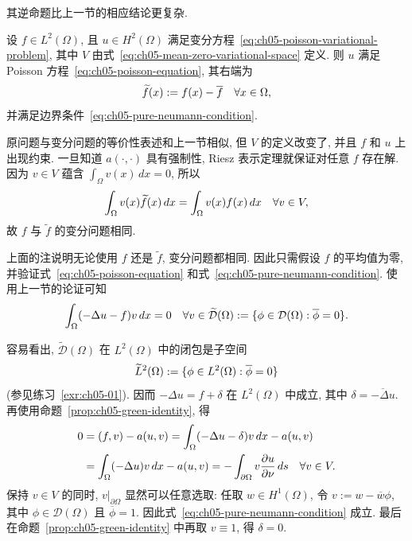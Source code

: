 其逆命题比上一节的相应结论更复杂.

\begin{Proposition}
\label{prop:ch05-pure-neumann-variational-implies-classical}
设 $f\in L^2(\Omega)$, 且 $u\in H^2(\Omega)$ 满足变分方程~\eqref{eq:ch05-poisson-variational-problem}, 其中 $V$ 由式~\eqref{eq:ch05-mean-zero-variational-space} 定义. 则 $u$ 满足 Poisson 方程~\eqref{eq:ch05-poisson-equation}, 其右端为
\[
\MathBookFormulaID{formula-ch05-mean-corrected-right-hand-side}
\widetilde f(x):=f(x)-\overline f\quad\forall x\in\Omega,
\]
并满足边界条件~\eqref{eq:ch05-pure-neumann-condition}.
\end{Proposition}

\begin{Remark}
\label{rem:ch05-pure-neumann-equivalence}
原问题与变分问题的等价性表述和上一节相似, 但 $V$ 的定义改变了, 并且 $f$ 和 $u$ 上出现约束. 一旦知道 $a(\cdot,\cdot)$ 具有强制性, Riesz 表示定理就保证对任意 $f$ 存在解. 因为 $v\in V$ 蕴含 $\int_\Omega v(x)\,dx=0$, 所以
\[
\MathBookFormulaID{formula-ch05-mean-corrected-functional-equivalence}
\int_\Omega v(x)\widetilde f(x)\,dx
=\int_\Omega v(x)f(x)\,dx\quad\forall v\in V,
\]
故 $f$ 与 $\widetilde f$ 的变分问题相同.
\end{Remark}
\begin{Proof}
上面的注说明无论使用 $f$ 还是 $\widetilde f$, 变分问题都相同. 因此只需假设 $f$ 的平均值为零, 并验证式~\eqref{eq:ch05-poisson-equation} 和式~\eqref{eq:ch05-pure-neumann-condition}. 使用上一节的论证可知
\[
\MathBookFormulaID{formula-ch05-mean-zero-test-equation}
\int_\Omega(-\Delta u-f)v\,dx=0
\quad\forall v\in\widetilde{\mathcal D}(\Omega)
:=\{\phi\in\mathcal D(\Omega):\overline\phi=0\}.
\]

容易看出, $\widetilde{\mathcal D}(\Omega)$ 在 $L^2(\Omega)$ 中的闭包是子空间
\[
\MathBookFormulaID{formula-ch05-mean-zero-l2-space}
\widetilde L^2(\Omega):=\{\phi\in L^2(\Omega):\overline\phi=0\}
\]
(参见练习~\ref{exr:ch05-01}). 因而 $-\Delta u=f+\delta$ 在 $L^2(\Omega)$ 中成立, 其中 $\delta=\overline{-\Delta u}$. 再使用命题~\ref{prop:ch05-green-identity}, 得
\[
\MathBookFormulaID{formula-ch05-pure-neumann-boundary-proof}
\begin{aligned}
0&=(f,v)-a(u,v)
=\int_\Omega(-\Delta u-\delta)v\,dx-a(u,v)\\
&=\int_\Omega(-\Delta u)v\,dx-a(u,v)
=-\int_{\partial\Omega}v\frac{\partial u}{\partial\nu}\,ds
\quad\forall v\in V.
\end{aligned}
\]
保持 $v\in V$ 的同时, $v|_{\partial\Omega}$ 显然可以任意选取: 任取 $w\in H^1(\Omega)$, 令 $v:=w-\overline w\phi$, 其中 $\phi\in\mathcal D(\Omega)$ 且 $\overline\phi=1$. 因此式~\eqref{eq:ch05-pure-neumann-condition} 成立. 最后在命题~\ref{prop:ch05-green-identity} 中再取 $v\equiv1$, 得 $\delta=0$.
\end{Proof}

